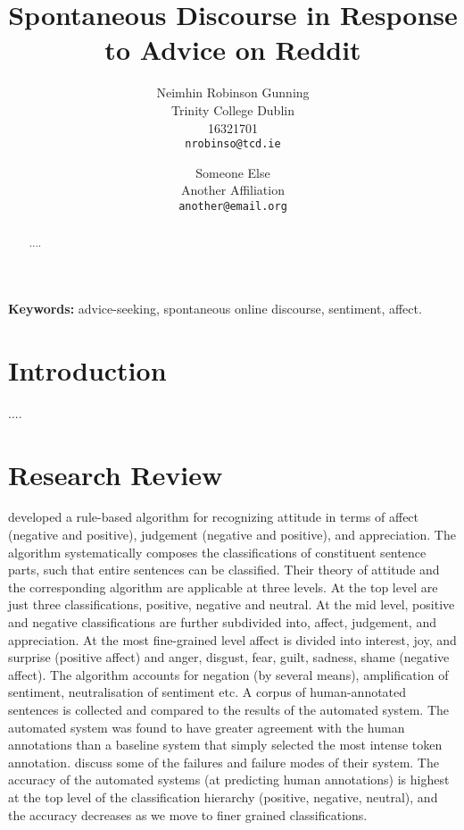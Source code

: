 \documentclass[a4paper,11pt]{article}
\title{Spontaneous Discourse in Response to Advice on Reddit}
\date{}
\author{Neimhin Robinson Gunning\\
       Trinity College Dublin\\
       16321701\\
       \texttt{nrobinso@tcd.ie}
  \and Someone Else\\
       Another Affiliation\\
       \texttt{another@email.org}
}
\begin{document}
\maketitle
\begin{abstract}
....
\end{abstract}

\textbf{Keywords:}
  advice-seeking,
  spontaneous online discourse,
  sentiment,
  affect.
\thispagestyle{empty}
\pagestyle{empty}

\section{Introduction}

....

\section{Research Review}

\cite{alfandre-2009}

\cite{brookes-2016}

\cite{smailhodzic-2016}

\cite{neviarouskaya-2010} developed a rule-based algorithm for recognizing attitude in terms of affect (negative and positive), judgement (negative and positive), and appreciation.
The algorithm systematically composes the classifications of constituent sentence parts, such that entire sentences can be classified. Their theory of attitude and the corresponding algorithm are applicable at three levels.
At the top level are just three classifications, positive, negative and neutral.
At the mid level, positive and negative classifications are further subdivided into, affect, judgement, and appreciation.
At the most fine-grained level affect is divided into interest, joy, and surprise (positive affect) and anger, disgust, fear, guilt, sadness, shame (negative affect).
The algorithm accounts for negation (by several means), amplification of sentiment, neutralisation of sentiment etc.
A corpus of human-annotated sentences is collected and compared to the results of the automated system.
The automated system was found to have greater agreement with the human annotations than a baseline system that simply selected the most intense token annotation.
\cite{neviarouskaya-2010} discuss some of the failures and failure modes of their system.
The accuracy of the automated systems (at predicting human annotations) is highest at the top level of the classification hierarchy (positive, negative, neutral), and the accuracy decreases as we move to finer grained classifications.
\end{document}
